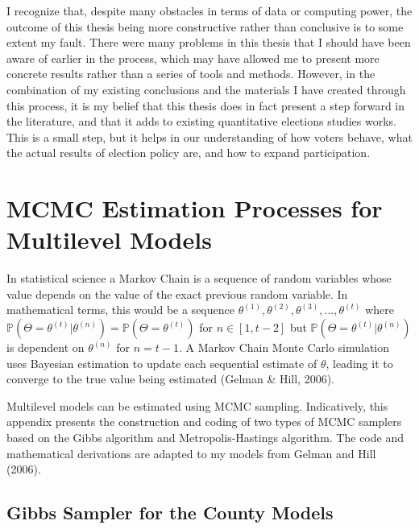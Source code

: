 \documentclass[12pt,twoside]{reedthesis}
\begin{document}
  I recognize that, despite many obstacles in terms of data or computing
  power, the outcome of this thesis being more constructive rather than
  conclusive is to some extent my fault. There were many problems in this
  thesis that I should have been aware of earlier in the process, which
  may have allowed me to present more concrete results rather than a
  series of tools and methods. However, in the combination of my existing
  conclusions and the materials I have created through this process, it is
  my belief that this thesis does in fact present a step forward in the
  literature, and that it adds to existing quantitative elections studies
  works. This is a small step, but it helps in our understanding of how
  voters behave, what the actual results of election policy are, and how
  to expand participation.
  
  \appendix
  
  \chapter{MCMC Estimation Processes for Multilevel
  Models}\label{mcmc-estimation-processes-for-multilevel-models}
  
  In statistical science a Markov Chain is a sequence of random variables
  whose value depends on the value of the exact previous random variable.
  In mathematical terms, this would be a sequence
  \(\theta^{(1)}, \theta^{(2)}, \theta^{(3)}, ..., \theta^{(t)}\) where
  \(\mathbb{P}(\Theta = \theta^{(t)}|\theta^{(n)}) = \mathbb{P}(\Theta = \theta^{(t)})\)
  for \(n \in [1,t-2]\) but
  \(\mathbb{P}(\Theta = \theta^{(t)}|\theta^{(n)})\) is dependent on
  \(\theta^{(n)}\) for \(n = t-1\). A Markov Chain Monte Carlo simulation
  uses Bayesian estimation to update each sequential estimate of
  \(\theta\), leading it to converge to the true value being estimated
  (Gelman \& Hill, 2006).
  
  Multilevel models can be estimated using MCMC sampling. Indicatively,
  this appendix presents the construction and coding of two types of MCMC
  samplers based on the Gibbs algorithm and Metropolis-Hastings algorithm.
  The code and mathematical derivations are adapted to my models from
  Gelman and Hill (2006).
  
  \section{Gibbs Sampler for the County
  Models}\label{gibbs-sampler-for-the-county-models}
  
\end{document}
